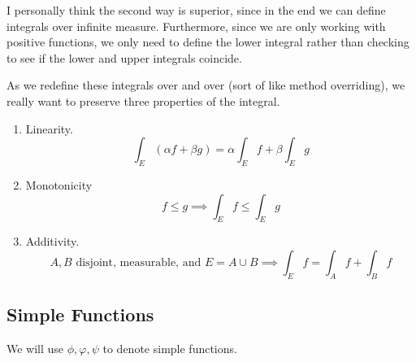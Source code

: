   I personally think the second way is superior, since in the end we can define integrals over infinite measure. Furthermore, since we are only working with positive functions, we only need to define the lower integral rather than checking to see if the lower and upper integrals coincide. 

  As we redefine these integrals over and over (sort of like method overriding), we really want to preserve three properties of the integral. 
  \begin{enumerate}
    \item Linearity. 
      \begin{equation}
        \int_E (\alpha f + \beta g) = \alpha \int_E f + \beta \int_E g 
      \end{equation}

    \item Monotonicity 
      \begin{equation}
        f \leq g \implies \int_E f \leq \int_E g 
      \end{equation}

    \item Additivity. 
      \begin{equation}
        A, B \text{ disjoint, measurable, and } E = A \cup B \implies \int_E f = \int_A f + \int_B f
      \end{equation}
  \end{enumerate}

\subsection{Simple Functions} 

  We will use $\phi, \varphi, \psi$ to denote simple functions. 

